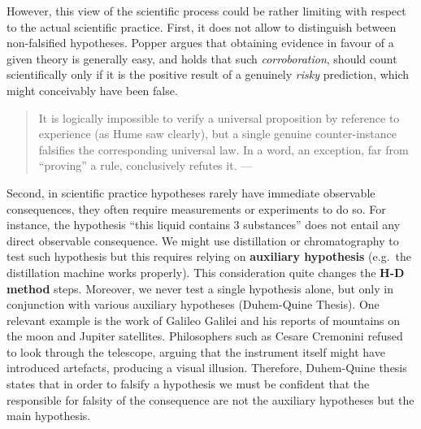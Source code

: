 \documentclass[
  12pt,
]{book}
\begin{document}
However, this view of the scientific process could be rather limiting with respect to the actual scientific practice. First, it does not allow to distinguish between non-falsified hypotheses. Popper argues that obtaining evidence in favour of a given theory is generally easy, and holds that such \emph{corroboration}, should count scientifically only if it is the positive result of a genuinely \emph{risky} prediction, which might conceivably have been false.

\begin{quote}
It is logically impossible to verify a universal proposition by reference to experience (as Hume saw clearly), but a single genuine counter-instance falsifies the corresponding universal law. In a word, an exception, far from ``proving'' a rule, conclusively refutes it. --- \citep{sep-popper}
\end{quote}

Second, in scientific practice hypotheses rarely have immediate observable consequences, they often require measurements or experiments to do so. For instance, the hypothesis ``this liquid contains 3 substances'' does not entail any direct observable consequence. We might use distillation or chromatography to test such hypothesis but this requires relying on \textbf{auxiliary hypothesis} (e.g.~the distillation machine works properly). This consideration quite changes the \textbf{H-D method} steps. Moreover, we never test a single hypothesis alone, but only in conjunction with various auxiliary hypotheses (Duhem-Quine Thesis). One relevant example is the work of Galileo Galilei and his reports of mountains on the moon and Jupiter satellites. Philosophers such as Cesare Cremonini refused to look through the telescope, arguing that the instrument itself might have introduced artefacts, producing a visual illusion. Therefore, Duhem-Quine thesis states that in order to falsify a hypothesis we must be confident that the responsible for falsity of the consequence are not the auxiliary hypotheses but the main hypothesis.
\end{document}
